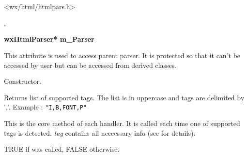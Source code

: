 %
%

\section{}\label{wxhtmltaghandler}




<wx/html/htmlpars.h>


,


\label{wxhtmltaghandlermparser}

{\bf wxHtmlParser* m\_Parser}

This attribute is used to access parent parser. It is protected so that
it can't be accessed by user but can be accessed from derived classes.

\label{wxhtmltaghandlerwxhtmltaghandler}


Constructor.

\label{wxhtmltaghandlergetsupportedtags}


Returns list of supported tags. The list is in uppercase and tags
are delimited by ','. Example : {\tt "I,B,FONT,P" }

\label{wxhtmltaghandlerhandletag}


This is the core method of each handler. It is called each time
one of supported tags is detected. {\it tag} contains all neccessary
info (see  for details).


TRUE if  was called,
FALSE otherwise.


